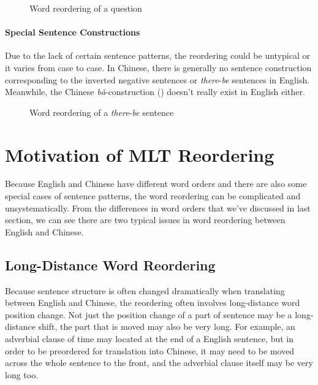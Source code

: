 \begin{figure}[H]
\centering

\caption{Word reordering of a question}
\label{question}
\end{figure}

\paragraph{Special Sentence Constructions}
Due to the lack of certain sentence patterns, the reordering could be untypical or it varies from case to case. In Chinese, there is generally no sentence construction corresponding to the inverted negative sentences or \emph{there}-\emph{be} sentences in English. Meanwhile, the Chinese \emph{bǎ}-construction () doesn't really exist in English either.

\begin{figure}[H]
\centering

\caption{Word reordering of a \emph{there}-\emph{be} sentence}
\end{figure}

\section{Motivation of \acf{MLT} Reordering}
\label{ch:ReorderingApproach:sec:Motivation}

Because English and Chinese have different word orders and there are also some special cases of sentence patterns, the word reordering can be complicated and unsystematically. From the differences in word orders that we've discussed in last section, we can see there are two typical issues in word reordering between English and Chinese.

\subsection{Long-Distance Word Reordering}

Because sentence structure is often changed dramatically when translating between English and Chinese, the reordering often involves long-distance word position change. Not just the position change of a part of sentence may be a long-distance shift, the part that is moved may also be very long. For example, an adverbial clause of time may located at the end of a English sentence, but in order to be preordered for translation into Chinese, it may need to be moved across the whole sentence to the front, and the adverbial clause itself may be very long too. 

